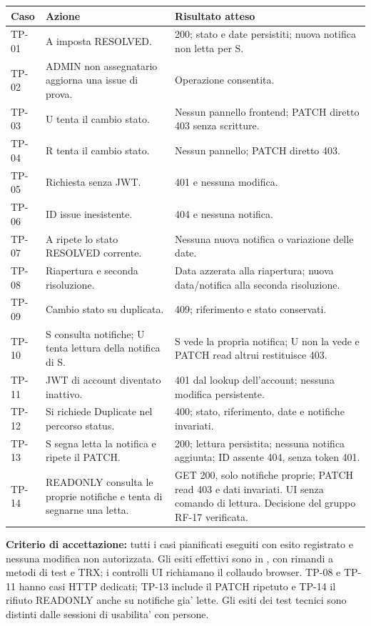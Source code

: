 \documentclass[11pt,a4paper,oneside]{report}
\begin{document}
\begin{longtable}{P{0.09\textwidth} P{0.38\textwidth} P{0.43\textwidth}}
\toprule Caso & Azione & Risultato atteso\\\midrule\endhead
TP-01 & A imposta RESOLVED. & 200; stato e date persistiti; nuova notifica non letta per S.\\
TP-02 & ADMIN non assegnatario aggiorna una issue di prova. & Operazione consentita.\\
TP-03 & U tenta il cambio stato. & Nessun pannello frontend; PATCH diretto 403 senza scritture.\\
TP-04 & R tenta il cambio stato. & Nessun pannello; PATCH diretto 403.\\
TP-05 & Richiesta senza JWT. & 401 e nessuna modifica.\\
TP-06 & ID issue inesistente. & 404 e nessuna notifica.\\
TP-07 & A ripete lo stato RESOLVED corrente. & Nessuna nuova notifica o variazione delle date.\\
TP-08 & Riapertura e seconda risoluzione. & Data azzerata alla riapertura; nuova data/notifica alla seconda risoluzione.\\
TP-09 & Cambio stato su duplicata. & 409; riferimento e stato conservati.\\
TP-10 & S consulta notifiche; U tenta lettura della notifica di S. & S vede la propria notifica; U non la vede e PATCH read altrui restituisce 403.\\
TP-11 & JWT di account diventato inattivo. & 401 dal lookup dell'account; nessuna modifica persistente.\\
TP-12 & Si richiede Duplicate nel percorso status. & 400; stato, riferimento, date e notifiche invariati.\\
TP-13 & S segna letta la notifica e ripete il PATCH. & 200; lettura persistita; nessuna notifica aggiunta; ID assente 404, senza token 401.\\
TP-14 & READONLY consulta le proprie notifiche e tenta di segnarne una letta. & GET 200, solo notifiche proprie; PATCH read 403 e dati invariati. UI senza comando di lettura. Decisione del gruppo RF-17 verificata.\\
\bottomrule
\end{longtable}
\textbf{Criterio di accettazione:} tutti i casi pianificati eseguiti con
esito registrato e nessuna modifica non autorizzata. Gli esiti effettivi sono
in , con rimandi a metodi di test e TRX; i controlli
UI richiamano il collaudo browser. TP-08 e TP-11 hanno casi HTTP dedicati;
TP-13 include il PATCH ripetuto e TP-14 il rifiuto READONLY anche su notifiche
gia' lette. Gli esiti dei test tecnici sono distinti dalle sessioni di
usabilita' con persone.
\end{document}
